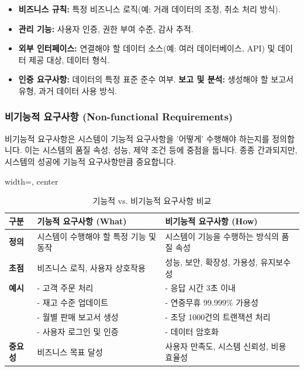 \documentclass[11pt,a4paper]{article}
\theoremstyle{definition}
\begin{document}
\begin{itemize}
    \item \textbf{비즈니스 규칙:} 특정 비즈니스 로직(예: 거래 데이터의 조정, 취소 처리 방식).
    \item \textbf{관리 기능:} 사용자 인증, 권한 부여 수준, 감사 추적.
    \item \textbf{외부 인터페이스:} 연결해야 할 데이터 소스(예: 여러 데이터베이스, API) 및 데이터 제공 대상, 데이터 형식.
    \item \textbf{인증 요구사항:} 데이터의 특정 표준 준수 여부.
    \textbf{보고 및 분석:} 생성해야 할 보고서 유형, 과거 데이터 사용 방식.
\end{itemize}

\subsubsection{비기능적 요구사항 (Non-functional Requirements)}
비기능적 요구사항은 시스템이 기능적 요구사항을 '어떻게' 수행해야 하는지를 정의합니다. 이는 시스템의 품질 속성, 성능, 제약 조건 등에 중점을 둡니다. 종종 간과되지만, 시스템의 성공에 기능적 요구사항만큼 중요합니다.

\begin{table}[h!]
\centering
\caption{기능적 vs. 비기능적 요구사항 비교}
\label{tab:functional_vs_nonfunctional}
\begin{adjustbox}{width=\textwidth, center}
\begin{tabular}{p{}p{}p{}}
\toprule
\textbf{구분} & \textbf{기능적 요구사항 (What)} & \textbf{비기능적 요구사항 (How)} \\
\midrule
\textbf{정의} & 시스템이 수행해야 할 특정 기능 및 동작 & 시스템이 기능을 수행하는 방식의 품질 속성 \\
\textbf{초점} & 비즈니스 로직, 사용자 상호작용 & 성능, 보안, 확장성, 가용성, 유지보수성 \\
\textbf{예시} & - 고객 주문 처리 & - 응답 시간 3초 이내 \\
& - 재고 수준 업데이트 & - 연중무휴 99.999\% 가용성 \\
& - 월별 판매 보고서 생성 & - 초당 1000건의 트랜잭션 처리 \\
& - 사용자 로그인 및 인증 & - 데이터 암호화 \\
\textbf{중요성} & 비즈니스 목표 달성 & 사용자 만족도, 시스템 신뢰성, 비용 효율성 \\
\bottomrule
\end{tabular}
\end{adjustbox}
\end{table}
\end{document}
